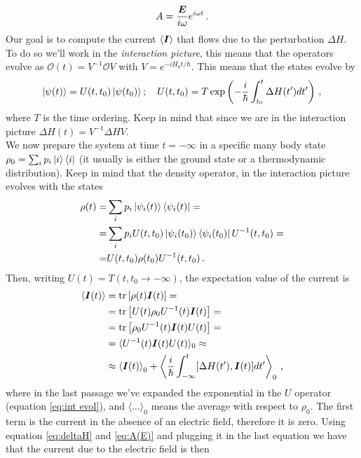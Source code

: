 \begin{equation}
    A=\frac{ \boldsymbol{E}}{i\omega}e^{i\omega t}\,.
    \label{eq:A(E)}
\end{equation}
Our goal is to compute the current $\langle \boldsymbol{I}\rangle$ that flows due to the perturbation $\Delta H$. To do so we'll work in the \textit{interaction picture}, this means that the operators evolve as $\mathcal O(t)=V^{-1}\mathcal O V$ with $V=e^{-iH_0t/\hbar}$. This means that the states evolve by 
\begin{equation}
    \ket{\psi(t)}=U(t,t_0)\ket{\psi(t_0)}; \quad 
    U(t,t_0)=T\exp\left(-\frac i\hbar \int_{t_0}^t\Delta H(t')dt'\right)\,,
    \label{eq:int evol}
\end{equation}
where $T$ is the time ordering. Keep in mind that since we are in the interaction picture $\Delta H(t)=V^{-1}\Delta HV$.\\
We now prepare the system at time $t=-\infty$ in a specific many body state $\rho_0=\sum_i p_i\ket{i}\bra{i}$ (it usually is either the ground state or a thermodynamic distribution). Keep in mind that the density operator, in the interaction picture evolves with the states
\begin{equation}
\begin{split}
        \rho(t)=&\sum_ip_i\ket{\psi_i(t)}\bra{\psi_i(t)}=\\
        =&\sum_ip_iU(t,t_0)\ket{\psi_i(t_0)}\bra{\psi_i(t_0)}U^{-1}(t,t_0)=\\
        =&U(t,t_0)\rho(t_0)U^{-1}(t,t_0)\,.
\end{split}
\end{equation}
Then, writing $U(t)=T(t,t_0\to-\infty)$, the expectation value of the current is
\begin{equation}
    \begin{split}
        \langle \boldsymbol{I}(t)\rangle &= \tr\left[\rho(t)\boldsymbol{I}(t)\right]=\\
        &=\tr\left[U(t)\rho_0 U^{-1}(t) \boldsymbol{I}(t)\right]=\\
        &=\tr\left[\rho_0 U^{-1}(t) \boldsymbol{I}(t)U(t)\right]=\\
        &=\langle U^{-1}(t) \boldsymbol{I}(t)U(t)\rangle_{0}\approx\\
        &\approx\left\langle\boldsymbol{I}(t)\right\rangle_{0} +
        \left\langle \frac i\hbar \int_{-\infty}^t[\Delta H(t'),\boldsymbol{I}(t)]dt'\right\rangle_0\,,
    \end{split}
\end{equation}
where in the last passage we've expanded the exponential in the $U$ operator (equation \ref{eq:int evol}), and $\langle \dots\rangle_0$ means the average with respect to $\rho_0$. The first term is the current in the absence of an electric field, therefore it is zero. Using equation \ref{eq:deltaH} and \ref{eq:A(E)} and plugging it in the last equation we have that the current due to the electric field is then
